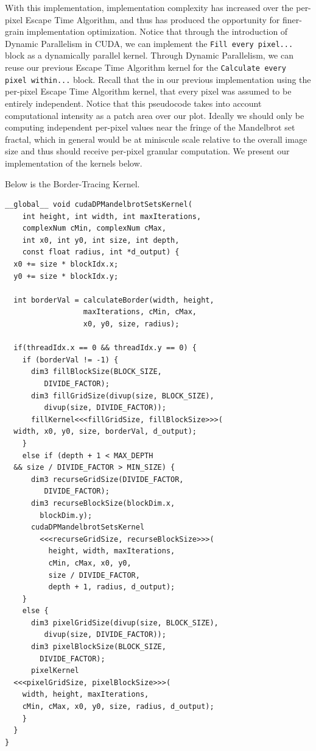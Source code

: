 \documentclass[letterpaper]{article}
\begin{document}
\begin{multicols}{2}
With this implementation, implementation complexity has increased over the
  per-pixel Escape Time Algorithm, and thus has produced the opportunity for
  finer-grain implementation optimization. Notice that through the introduction
  of Dynamic Parallelism in CUDA, we can implement the 
  \texttt{Fill every pixel...} block as a dynamically parallel kernel. Through 
  Dynamic Parallelism, we can reuse our previous Escape Time Algorithm kernel
  for the \texttt{Calculate every pixel within...} block.
Recall that the in our previous implementation using the per-pixel Escape Time
  Algorithm kernel, that every pixel was assumed to be entirely independent.
  Notice that this pseudocode takes into account computational intensity as a
  patch area over our plot. Ideally we should only be computing independent 
  per-pixel values near the fringe of the Mandelbrot set fractal, which in
  general would be at miniscule scale relative to the overall image size and
  thus should receive per-pixel granular computation.
We present our implementation of the kernels below.

Below is the Border-Tracing Kernel.

\begin{lstlisting}
__global__ void cudaDPMandelbrotSetsKernel(
    int height, int width, int maxIterations,
    complexNum cMin, complexNum cMax, 
    int x0, int y0, int size, int depth, 
    const float radius, int *d_output) {
  x0 += size * blockIdx.x;
  y0 += size * blockIdx.y;

  int borderVal = calculateBorder(width, height, 
                  maxIterations, cMin, cMax, 
                  x0, y0, size, radius); 

  if(threadIdx.x == 0 && threadIdx.y == 0) {
    if (borderVal != -1) {
      dim3 fillBlockSize(BLOCK_SIZE, 
         DIVIDE_FACTOR);
      dim3 fillGridSize(divup(size, BLOCK_SIZE), 
         divup(size, DIVIDE_FACTOR));
      fillKernel<<<fillGridSize, fillBlockSize>>>(
  width, x0, y0, size, borderVal, d_output);
    }
    else if (depth + 1 < MAX_DEPTH 
  && size / DIVIDE_FACTOR > MIN_SIZE) {
      dim3 recurseGridSize(DIVIDE_FACTOR, 
         DIVIDE_FACTOR);
      dim3 recurseBlockSize(blockDim.x, 
        blockDim.y);
      cudaDPMandelbrotSetsKernel
        <<<recurseGridSize, recurseBlockSize>>>(
          height, width, maxIterations, 
          cMin, cMax, x0, y0, 
          size / DIVIDE_FACTOR, 
          depth + 1, radius, d_output); 
    }
    else {
      dim3 pixelGridSize(divup(size, BLOCK_SIZE), 
         divup(size, DIVIDE_FACTOR));
      dim3 pixelBlockSize(BLOCK_SIZE, 
        DIVIDE_FACTOR);
      pixelKernel
  <<<pixelGridSize, pixelBlockSize>>>(
    width, height, maxIterations,
    cMin, cMax, x0, y0, size, radius, d_output);
    }
  }
}
\end{lstlisting}


\end{multicols}
\end{document}
